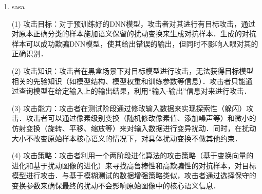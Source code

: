 
\begin{enumerate}
\item sasa
	\item [(1)]
    攻击目标：对于预训练好的DNN模型，攻击者对其进行有目标攻击，通过对原本正确分类的样本施加语义保留的扰动变换来生成对抗样本．生成的对抗样本可以成功欺骗DNN模型，使其给出错误的输出，但同时不影响人眼对其的正确识别．

	\item [(2)]
    攻击知识：攻击者在黑盒场景下对目标模型进行攻击，无法获得目标模型相关的先验知识（如模型结构、模型权重和训练参数等信息）．攻击者只能通过查询模型在给定输入上的输出结果，利用“输入-输出”信息对来进行攻击．

	\item [(3)]
    攻击能力：攻击者在测试阶段通过修改输入数据来实现探索性（躲闪）攻击．攻击者可以通过像素级别变换（随机修改像素值、添加噪声等）和微小的仿射变换（旋转、平移、缩放等）来对输入数据进行变异扰动．同时，在扰动大小不改变原始样本核心语义的情况下，对具体扰动变换不做其他约束．

	\item [(4)]
    攻击策略：攻击者利用一个两阶段进化算法的攻击策略（基于变换向量的进化和基于扰动图像的进化）来寻找高鲁棒性和高欺骗性的对抗样本，对目标模型进行攻击．与基于模糊测试的数据增强策略类似，攻击者通过选择保守的变换参数来确保最终的扰动不会影响原始图像中的核心语义信息．

\end{enumerate}